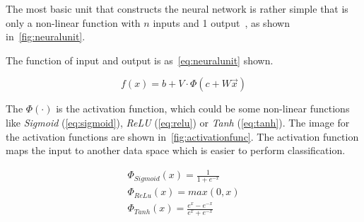\begin{spacing}{1.5}
The most basic unit that constructs the neural network is rather simple that is only a non-linear function with $n$ inputs and 1 output~\cite{bengio2017deep}, as shown in~\autoref{fig:neuralunit}. 

The function of input and output is as~\autoref{eq:neuralunit} shown. 

\begin{equation}
\label{eq:neuralunit}
    f(x)=b+V \cdot \Phi (c+W \vec{x})
\end{equation}

The $\Phi (\cdot)$ is the activation function, which could be some non-linear functions like \textit{Sigmoid} (\autoref{eq:sigmoid}), \textit{ReLU} (\autoref{eq:relu}) or \textit{Tanh} (\autoref{eq:tanh}). The image for the activation functions are shown in~\autoref{fig:activationfunc}. The activation function maps the input to another data space which is easier to perform classification. 



\begin{gather}
   \Phi_{Sigmoid}(x)=\frac{1}{1+e^{-x}} \label{eq:sigmoid}\\
   \Phi_{ReLu}(x)=max(0,x) \label{eq:relu}\\
   \Phi_{Tanh}(x)=\frac{e^{x}-e^{-x}}{e^{x}+e^{-x}} \label{eq:tanh}
\end{gather}


\end{spacing}
